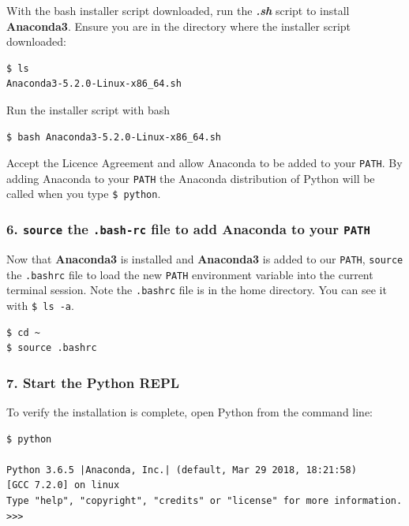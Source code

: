 \documentclass{book}
\begin{document}
With the bash installer script downloaded, run the \textbf{\emph{.sh}}
script to install \textbf{Anaconda3}. Ensure you are in the directory
where the installer script downloaded:

\begin{lstlisting}
$ ls
Anaconda3-5.2.0-Linux-x86_64.sh
\end{lstlisting}

Run the installer script with bash

\begin{lstlisting}
$ bash Anaconda3-5.2.0-Linux-x86_64.sh
\end{lstlisting}

Accept the Licence Agreement and allow Anaconda to be added to your
\lstinline!PATH!. By adding Anaconda to your \lstinline!PATH! the
Anaconda distribution of Python will be called when you type
\lstinline!$ python!.
    




    
        \subsubsection{\texorpdfstring{6. \texttt{source} the \texttt{.bash-rc}
file to add Anaconda to your
\texttt{PATH}}{6. source the .bash-rc file to add Anaconda to your PATH}}\label{source-the-.bash-rc-file-to-add-anaconda-to-your-path}

Now that \textbf{Anaconda3} is installed and \textbf{Anaconda3} is added
to our \lstinline!PATH!, \lstinline!source! the \lstinline!.bashrc! file
to load the new \lstinline!PATH! environment variable into the current
terminal session. Note the \lstinline!.bashrc! file is in the home
directory. You can see it with \lstinline!$ ls -a!.

\begin{lstlisting}
$ cd ~
$ source .bashrc
\end{lstlisting}
    




    
        \subsubsection{7. Start the Python REPL}\label{start-the-python-repl}

To verify the installation is complete, open Python from the command
line:

\begin{lstlisting}
$ python

Python 3.6.5 |Anaconda, Inc.| (default, Mar 29 2018, 18:21:58)
[GCC 7.2.0] on linux
Type "help", "copyright", "credits" or "license" for more information.
>>>
\end{lstlisting}
\end{document}
